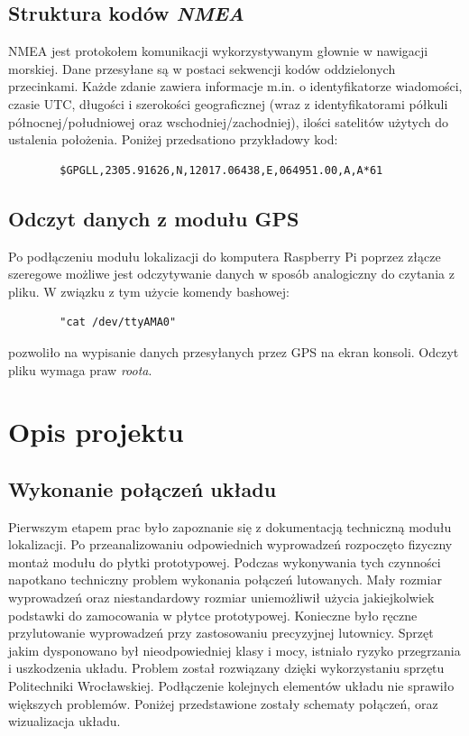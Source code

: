 \documentclass{article}
\begin{document}
	\subsection{Struktura kodów \textit{NMEA}}
		NMEA jest protokołem komunikacji wykorzystywanym głownie w nawigacji morskiej. Dane przesyłane są w postaci sekwencji kodów oddzielonych przecinkami. Każde zdanie zawiera informacje m.in. o identyfikatorze wiadomości, czasie UTC, długości i szerokości geograficznej (wraz z identyfikatorami półkuli północnej/południowej oraz wschodniej/zachodniej),  ilości satelitów użytych do ustalenia położenia. Poniżej przedsationo przykładowy kod:
		\begin{verbatim}
		$GPGLL,2305.91626,N,12017.06438,E,064951.00,A,A*61
		\end{verbatim}
    \subsection{Odczyt danych z modułu GPS }
    
	   Po podłączeniu modułu lokalizacji do komputera Raspberry Pi poprzez złącze szeregowe możliwe jest odczytywanie danych w sposób analogiczny do czytania z pliku. W związku z tym użycie komendy bashowej:
	   	\begin{verbatim}
	   	"cat /dev/ttyAMA0"
	   	\end{verbatim} 
	   	pozwoliło na wypisanie danych przesyłanych przez GPS na ekran konsoli. Odczyt pliku wymaga praw \textit{roota}.
\section{Opis projektu}
	\subsection{Wykonanie połączeń układu}
		Pierwszym etapem prac było zapoznanie się z dokumentacją techniczną modułu lokalizacji. Po przeanalizowaniu odpowiednich wyprowadzeń rozpoczęto fizyczny montaż modułu do płytki prototypowej. Podczas wykonywania tych czynności napotkano techniczny problem wykonania połączeń lutowanych. Mały rozmiar wyprowadzeń oraz niestandardowy rozmiar uniemożliwił użycia jakiejkolwiek podstawki do zamocowania w płytce prototypowej. Konieczne było ręczne przylutowanie wyprowadzeń przy zastosowaniu precyzyjnej lutownicy. Sprzęt jakim dysponowano był nieodpowiedniej klasy i mocy, istniało ryzyko przegrzania i uszkodzenia układu. Problem został rozwiązany dzięki wykorzystaniu sprzętu Politechniki Wrocławskiej. Podłączenie kolejnych elementów układu nie sprawiło większych problemów. Poniżej przedstawione zostały schematy połączeń, oraz wizualizacja układu.
		
\end{document}
